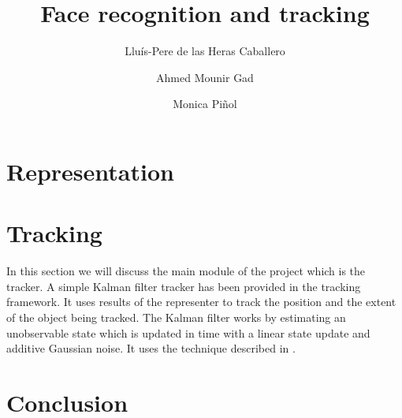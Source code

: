 \documentclass[12pt]{article}
\author{
	Llu\'{i}s-Pere de las Heras Caballero \and
	Ahmed Mounir Gad \and
	Monica Pi\~{n}ol 
}
\title{Face recognition and tracking}
\begin{document}
\maketitle
\thispagestyle{empty}
\newpage




\section{Representation}
\section{Tracking}

In this section we will discuss the main module of the project which is the tracker. A simple Kalman filter tracker has been provided in the tracking framework. It uses results of the representer to track the position and the extent of the object being tracked. The Kalman filter works by estimating an unobservable state which is updated in time with a linear state update and additive Gaussian noise. It uses the technique described in \cite{Arulampalam01atutorial}.



\section{Conclusion}



\end{document}
